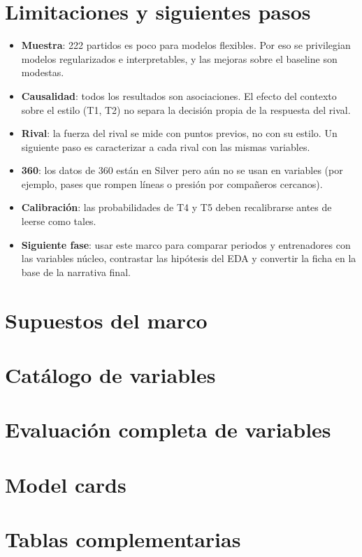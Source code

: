 \documentclass[11pt,a4paper]{article}
\begin{document}


\section{Limitaciones y siguientes pasos}\label{sec:limitaciones}
\begin{itemize}
  \item \textbf{Muestra}: 222 partidos es poco para modelos flexibles. Por eso se privilegian modelos regularizados e
        interpretables, y las mejoras sobre el baseline son modestas.
  \item \textbf{Causalidad}: todos los resultados son asociaciones. El efecto del contexto sobre el estilo (T1, T2) no
        separa la decisión propia de la respuesta del rival.
  \item \textbf{Rival}: la fuerza del rival se mide con puntos previos, no con su estilo. Un siguiente paso es
        caracterizar a cada rival con las mismas variables.
  \item \textbf{360}: los datos de 360 están en Silver pero aún no se usan en variables (por ejemplo, pases que rompen
        líneas o presión por compañeros cercanos).
  \item \textbf{Calibración}: las probabilidades de T4 y T5 deben recalibrarse antes de leerse como tales.
  \item \textbf{Siguiente fase}: usar este marco para comparar periodos y entrenadores con las variables núcleo,
        contrastar las hipótesis del EDA y convertir la ficha en la base de la narrativa final.
\end{itemize}

\appendix
\section{Supuestos del marco}\label{app:assumptions}


\section{Catálogo de variables}\label{app:catalog}


\section{Evaluación completa de variables}\label{app:varEval}


\section{Model cards}\label{app:cards}


\section{Tablas complementarias}


\end{document}
